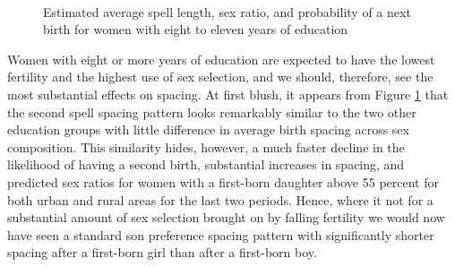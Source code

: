 \documentclass[12pt,letterpaper]{article}
\begin{document}
\begin{figure}[htpb]
\centering
{}
\\
\caption{Estimated average spell length, sex ratio, and probability of 
a next birth for women with eight to eleven years of education}
\label{fig:bootstrap_high}
\end{figure}


Women with eight or more years of education are expected to have the lowest fertility and 
the highest use of sex selection, and we should, therefore, see the most substantial 
effects on spacing.
At first blush, it appears from Figure \ref{fig:bootstrap_high} that the second spell 
spacing pattern looks remarkably similar to the two other education groups with little 
difference in average birth spacing across sex composition.
This similarity hides, however, a much faster decline in the likelihood of having a second 
birth, substantial increases in spacing, and predicted sex ratios for women with a 
first-born daughter above 55 percent for both urban and rural areas for the last two 
periods.
Hence, where it not for a substantial amount of sex selection brought on by falling
fertility we would now have seen a standard son preference spacing pattern with 
significantly shorter spacing after a first-born girl than after a first-born boy.
\end{document}

